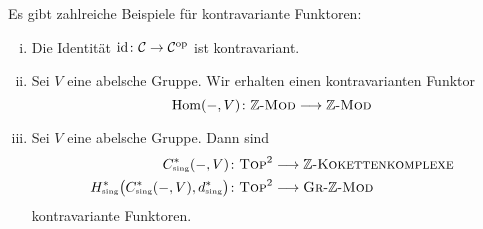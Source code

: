 \begin{beispiel}[{name=[kontravariante Funktoren]}] Es gibt zahlreiche Beispiele für kontravariante Funktoren:
	\begin{enumerate}[i),itemsep=0pt]
		\item Die Identität $\operatorname{id} \colon \mathcal{C} \to \mathcal{C}^{\mathrm{op}}$ ist kontravariant.
		\item Sei $V$ eine abelsche Gruppe. Wir erhalten einen kontravarianten Funktor
		\[
			\operatorname{Hom}(-,V) \colon \mathbb{Z}\text{-}\textsc{Mod}  \longrightarrow \mathbb{Z}\text{-}\textsc{Mod}
		\]
		\item Sei $V$ eine abelsche Gruppe. Dann sind 
		\begin{align}
			C_\sing^*(-,V) &\colon \TOP^2 \longrightarrow \mathbb{Z}\text{-}\textsc{Kokettenkomplexe}  \\
			H^*_\sing \enbrace[\big]{C_\sing^*(-,V),d_\sing^*} &\colon \TOP^2 \longrightarrow \textsc{Gr}\text{-}\mathbb{Z}\text{-}\MOD   
		\end{align}
		kontravariante Funktoren.
	\end{enumerate}
\end{beispiel}

